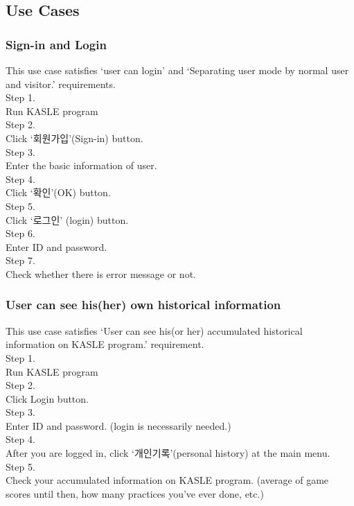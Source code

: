 \documentclass[10pt,journal,compsoc]{IEEEtran}
\begin{document}
\subsection{Use Cases\\} 
\subsubsection{Sign-in and Login\\}
This use case satisfies ‘user can login’ and ‘Separating user mode by normal user and visitor.’ requirements.
\\Step 1.
\\Run KASLE program
\\Step 2.
\\Click ‘회원가입’(Sign-in) button.
\\Step 3.
\\Enter the basic information of user.
\\Step 4. 
\\Click ‘확인’(OK) button.
\\Step 5.
\\Click ‘로그인’ (login) button.
\\Step 6.
\\Enter ID and password.
\\Step 7.
\\Check whether there is error message or not.

\subsubsection{User can see his(her) own historical information\\}
This use case satisfies ‘User can see his(or her) accumulated historical information on KASLE program.’ requirement.
\\Step 1.
\\Run KASLE program
\\Step 2.
\\Click Login button.
\\Step 3. 
\\Enter ID and password. (login is necessarily needed.)
\\Step 4.
\\After you are logged in, click ‘개인기록’(personal history) at the main menu.
\\Step 5. 
\\Check your accumulated information on KASLE program. (average of game scores until then, how many practices you’ve ever done, etc.)
\end{document}
